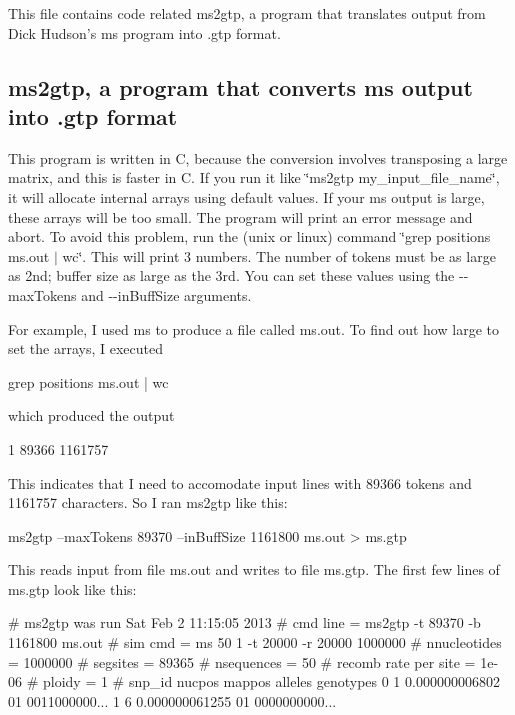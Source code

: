 This file contains code related ms2gtp, a program that translates output from Dick Hudson's {\ttfamily ms} program into .gtp format.

\subsection*{ms2gtp, a program that converts {\ttfamily ms} output into .gtp format }

This program is written in C, because the conversion involves transposing a large matrix, and this is faster in C. If you run it like \char`\"{}ms2gtp my\+\_\+input\+\_\+file\+\_\+name\char`\"{}, it will allocate internal arrays using default values. If your {\ttfamily ms} output is large, these arrays will be too small. The program will print an error message and abort. To avoid this problem, run the (unix or linux) command \char`\"{}grep positions
ms.\+out $\vert$ wc\char`\"{}. This will print 3 numbers. The number of tokens must be as large as 2nd; buffer size as large as the 3rd. You can set these values using the {\ttfamily -\/-\/max\+Tokens} and {\ttfamily -\/-\/in\+Buff\+Size} arguments.

For example, I used {\ttfamily ms} to produce a file called {\ttfamily ms.\+out}. To find out how large to set the arrays, I executed \begin{DoxyVerb}grep positions ms.out | wc 
\end{DoxyVerb}


which produced the output \begin{DoxyVerb}1   89366 1161757
\end{DoxyVerb}


This indicates that I need to accomodate input lines with 89366 tokens and 1161757 characters. So I ran {\ttfamily ms2gtp} like this\+: \begin{DoxyVerb}ms2gtp --maxTokens 89370 --inBuffSize 1161800 ms.out > ms.gtp
\end{DoxyVerb}


This reads input from file {\ttfamily ms.\+out} and writes to file {\ttfamily ms.\+gtp}. The first few lines of {\ttfamily ms.\+gtp} look like this\+: \begin{DoxyVerb}# ms2gtp was run Sat Feb  2 11:15:05 2013
# cmd line     = ms2gtp -t 89370 -b 1161800 ms.out
# sim cmd      = ms 50 1 -t 20000 -r 20000 1000000
# nnucleotides = 1000000
# segsites     = 89365
# nsequences   = 50
# recomb rate per site = 1e-06
# ploidy       = 1
#   snp_id     nucpos         mappos alleles genotypes
         0          1 0.000000006802      01 0011000000...
         1          6 0.000000061255      01 0000000000...
\end{DoxyVerb}


